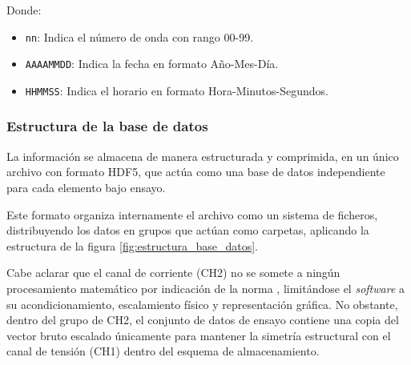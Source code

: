 Donde:
\begin{itemize}
    \item \texttt{nn}: Indica el número de onda con rango 00-99.
    \item \texttt{AAAAMMDD}: Indica la fecha en formato Año-Mes-Día.
    \item \texttt{HHMMSS}: Indica el horario en formato Hora-Minutos-Segundos.
\end{itemize}
\vspace{3\baselineskip}

\subsubsection{Estructura de la base de datos}
\label{subsubsec:estructura_base_datos}

La información se almacena de manera estructurada y comprimida, en un único archivo con formato HDF5, que actúa como una base de datos independiente para cada elemento bajo ensayo.

Este formato organiza internamente el archivo como un sistema de ficheros, distribuyendo los datos en grupos que actúan como carpetas, aplicando la estructura de la figura \ref{fig:estructura_base_datos}.

Cabe aclarar que el canal de corriente (CH2) no se somete a ningún procesamiento matemático por indicación de la norma \cite{iec60060_1}, limitándose el \emph{software} a su acondicionamiento, escalamiento físico y representación gráfica. No obstante, dentro del grupo de CH2, el conjunto de datos de ensayo contiene una copia del vector bruto escalado únicamente para mantener la simetría estructural con el canal de tensión (CH1) dentro del esquema de almacenamiento.

